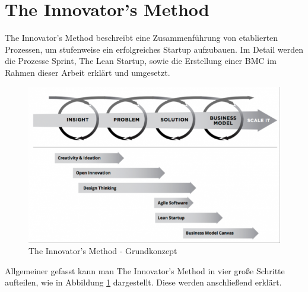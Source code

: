\section{The Innovator's Method}
\label{sec:TheInnovatorsMethod}
The Innovator's Method beschreibt eine Zusammenführung von etablierten Prozessen, um stufenweise ein erfolgreiches Startup aufzubauen.
Im Detail werden die Prozesse Sprint, The Lean Startup, sowie die Erstellung einer \ac{BMC} im Rahmen dieser Arbeit erklärt und umgesetzt.

\begin{figure}[h!]
	\begin{center}
		\includegraphics[width=\textwidth]{99_IMG/02_Grundlagen/innovatorsMethod.png}
		\caption{The Innovator's Method - Grundkonzept}
		\label{fig:TheInnovatorsMethod}
	\end{center}
\end{figure}

Allgemeiner gefasst kann man The Innovator's Method in vier große Schritte aufteilen, wie in Abbildung \ref{fig:TheInnovatorsMethod} dargestellt. Diese werden anschließend erklärt.

